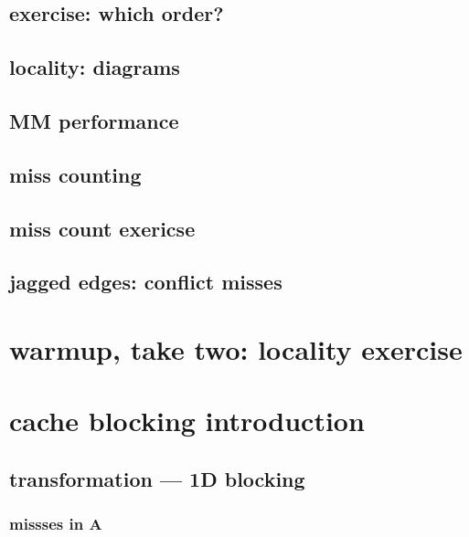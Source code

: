 \subsection{exercise: which order?}

\subsection{locality: diagrams}



\subsection{MM performance}


\subsection{miss counting}


\subsection{miss count exericse}


\subsection{jagged edges: conflict misses} %



\section{warmup, take two: locality exercise}


\section{cache blocking introduction}
%
\subsection{transformation --- 1D blocking}

\subsubsection{missses in A}

